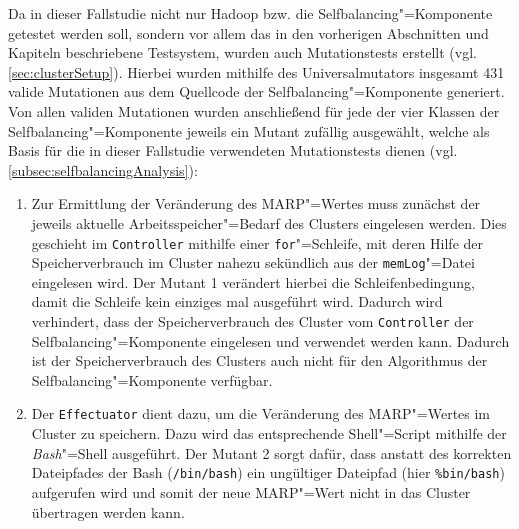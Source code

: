 Da in dieser Fallstudie nicht nur Hadoop bzw. die Selfbalancing"=Komponente getestet werden soll, sondern vor allem das in den vorherigen Abschnitten und Kapiteln beschriebene Testsystem, wurden auch Mutationstests erstellt (vgl. \cref{sec:clusterSetup}).
Hierbei wurden mithilfe des Universalmutators insgesamt 431 valide Mutationen aus dem Quellcode der Selfbalancing"=Komponente generiert.
Von allen validen Mutationen wurden anschließend für jede der vier Klassen der Selfbalancing"=Komponente jeweils ein Mutant zufällig ausgewählt, welche als Basis für die in dieser Fallstudie verwendeten Mutationstests dienen (vgl. \cref{subsec:selfbalancingAnalysis}):

\begin{enumerate}[itemsep=5pt]
    \item
    Zur Ermittlung der Veränderung des \gls{MARP}"=Wertes muss zunächst der jeweils aktuelle Arbeitsspeicher"=Bedarf des Clusters eingelesen werden.
    Dies geschieht im \texttt{Controller} mithilfe einer \texttt{for}"=Schleife, mit deren Hilfe der Speicherverbrauch im Cluster nahezu sekündlich aus der \texttt{memLog}"=Datei eingelesen wird.
    Der Mutant 1 verändert hierbei die Schleifenbedingung, damit die Schleife kein einziges mal ausgeführt wird.
    Dadurch wird verhindert, dass der Speicherverbrauch des Cluster vom \texttt{Controller} der Selfbalancing"=Komponente eingelesen und verwendet werden kann.
    Dadurch ist der Speicherverbrauch des Clusters auch nicht für den Algorithmus \cite{Zhang2016} der Selfbalancing"=Komponente verfügbar.
    
    \item 
    Der \texttt{Effectuator} dient dazu, um die Veränderung des \gls{MARP}"=Wertes im Cluster zu speichern.
    Dazu wird das entsprechende Shell"=Script mithilfe der \emph{Bash}"=Shell ausgeführt.
    Der Mutant 2 sorgt dafür, dass anstatt des korrekten Dateipfades der Bash (\texttt{/bin/bash}) ein ungültiger Dateipfad (hier \texttt{\%bin/bash}) aufgerufen wird und somit der neue \gls{MARP}"=Wert nicht in das Cluster übertragen werden kann.
    

\end{enumerate}
